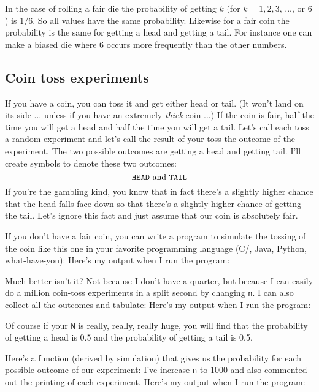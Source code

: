 In the case of rolling a fair die 
the probability of getting $k$ (for $k = 1, 2, 3$, ..., or $6$) is
$1/6$.
So all values have the same probability.
Likewise for a fair coin the probability is the same
for getting a head and getting a tail.
For instance one can make a biased die where 6 occurs more frequently
than the other numbers.








\subsection{Coin toss experiments}

If you have a coin, you can toss it and get either head or tail.
(It won't land on its side ... unless if you have
an extremely \textit{ thick} coin ...)
If the coin is fair, half the time you will get a head and 
half the time you will get a tail.
Let's call each toss a random experiment and let's
call the result of your toss the outcome of the experiment.
The two possible outcomes are getting a head and getting tail.
I'll create symbols to denote these two outcomes:
\[
  \texttt{HEAD} \text{ and } \texttt{TAIL}
\]
If you're the gambling kind, you know that in fact there's a slightly
higher chance that the head falls face down so that 
there's a slightly higher chance of getting the tail.
Let's ignore this fact and just assume that our coin is absolutely fair.

If you don't have a fair coin, you can write a 
program to simulate the tossing of the coin like this one
in your favorite programming language (C/\cpp, Java, Python, what-have-you):
{\footnotesize
{}
}
Here's my output when I run the program:


Much better isn't it?
Not because I don't have a quarter, but because I can easily
do a million coin-toss experiments in a split second by changing \verb!n!.
I can also collect all the outcomes and tabulate:
{\small
{}
}
Here's my output when I run the program:




Of course if your \verb!N! is really, really, really huge,
you will find that the probability of getting a head is 0.5 and 
the probability of getting a tail is 0.5.

Here's a function (derived by simulation) 
that gives us the probability for each possible outcome
of our experiment:
I've increase \verb!n! to 1000 and 
also commented out the printing of each experiment.
Here's my output when I run the program:


